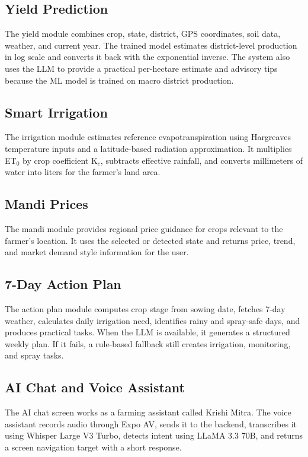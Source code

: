 \documentclass[12pt,a4paper]{report}
\begin{document}
\subsection{Yield Prediction}

The yield module combines crop, state, district, GPS coordinates, soil data, weather, and current year. The trained model estimates district-level production in log scale and converts it back with the exponential inverse. The system also uses the LLM to provide a practical per-hectare estimate and advisory tips because the ML model is trained on macro district production.

\subsection{Smart Irrigation}

The irrigation module estimates reference evapotranspiration using Hargreaves temperature inputs and a latitude-based radiation approximation. It multiplies ET$_0$ by crop coefficient K$_c$, subtracts effective rainfall, and converts millimeters of water into liters for the farmer's land area.

\subsection{Mandi Prices}

The mandi module provides regional price guidance for crops relevant to the farmer's location. It uses the selected or detected state and returns price, trend, and market demand style information for the user.

\subsection{7-Day Action Plan}

The action plan module computes crop stage from sowing date, fetches 7-day weather, calculates daily irrigation need, identifies rainy and spray-safe days, and produces practical tasks. When the LLM is available, it generates a structured weekly plan. If it fails, a rule-based fallback still creates irrigation, monitoring, and spray tasks.

\subsection{AI Chat and Voice Assistant}

The AI chat screen works as a farming assistant called Krishi Mitra. The voice assistant records audio through Expo AV, sends it to the backend, transcribes it using Whisper Large V3 Turbo, detects intent using LLaMA 3.3 70B, and returns a screen navigation target with a short response.
\end{document}
